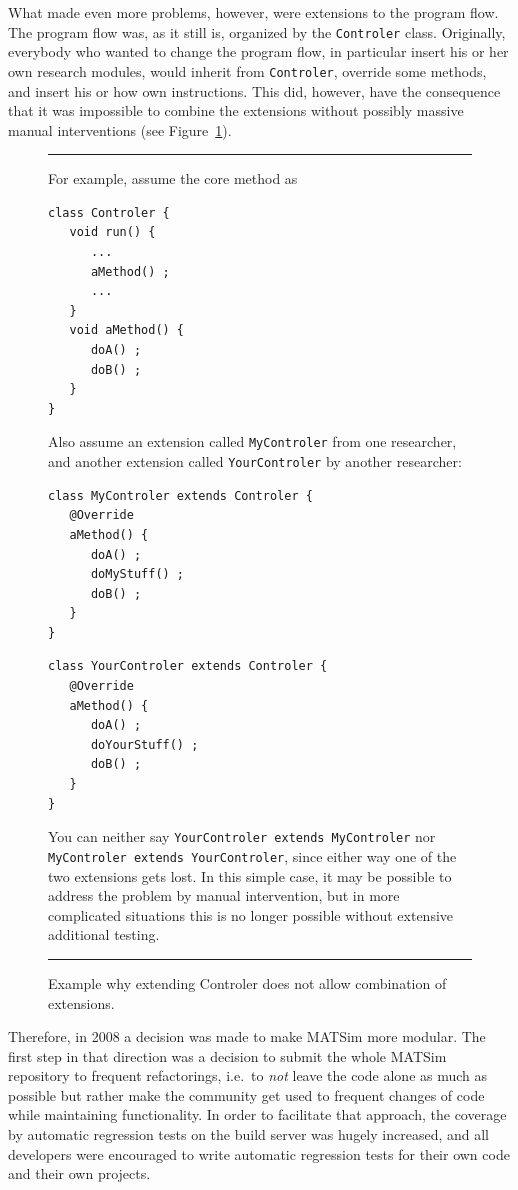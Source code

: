 What made even more problems, however, were extensions to the program flow.  The program flow was, as it still is, organized by the \lstinline$Controler$ class.  Originally, everybody who wanted to change the program flow, in particular insert his or her own research modules, would inherit from \lstinline$Controler$, override some methods, and insert his or how own instructions.  This did, however, have the consequence that it was impossible to combine the extensions without possibly massive manual interventions (see Figure~\ref{fig:do-not-extend-controler}).

\begin{figure}\footnotesize
\hrule
\strut For example, assume the core method as
\begin{lstlisting}
class Controler {
   void run() {
      ...
      aMethod() ;
      ...
   }
   void aMethod() {
      doA() ;
      doB() ;
   }
}
\end{lstlisting}
Also assume an extension called \protect\lstinline$MyControler$
from one researcher, and another extension called \protect\lstinline$YourControler$ by another researcher:
\begin{lstlisting}
class MyControler extends Controler {
   @Override
   aMethod() {
      doA() ;
      doMyStuff() ;
      doB() ;
   }
}
\end{lstlisting}
\begin{lstlisting}
class YourControler extends Controler {
   @Override
   aMethod() {
      doA() ;
      doYourStuff() ;
      doB() ;
   }
}  
\end{lstlisting}
You can neither say \protect\lstinline$YourControler extends MyControler$ nor \protect\lstinline$MyControler extends YourControler$, since either way one of the two extensions gets lost.  In this simple case, it may be possible to address the problem by manual intervention, but in more complicated situations this is no longer possible without extensive additional testing. \strut
\hrule
\caption{Example why extending Controler does not allow combination of extensions.}
\label{fig:do-not-extend-controler}
\end{figure}

Therefore, in 2008 a decision was made to make MATSim more modular.  The first step in that direction was a decision to submit the whole MATSim repository to frequent refactorings, i.e.\ to \emph{not} leave the code alone as much as possible but rather make the community get used to frequent changes of code while maintaining functionality.  In order to facilitate that approach, the coverage by automatic regression tests on the build server was hugely increased, and all developers were encouraged to write automatic regression tests for their own code and their own projects. 

